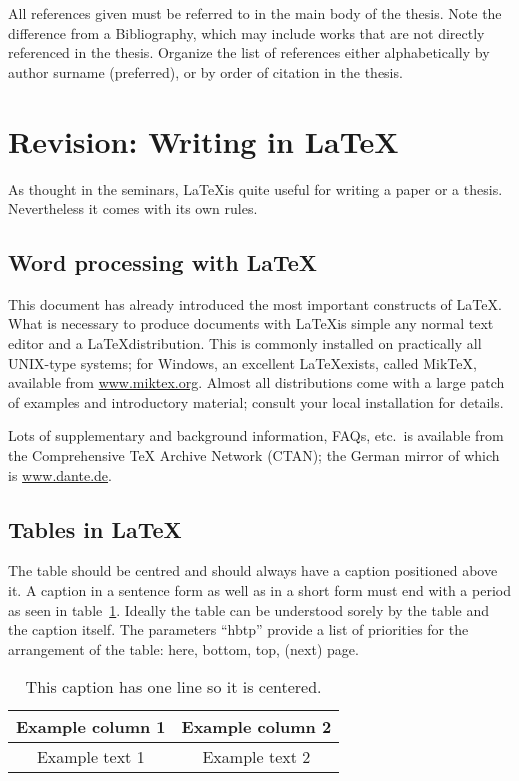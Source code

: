 All references given must be referred to in the main body of the thesis. Note the difference from a Bibliography, which may include works that are not directly referenced in the thesis. Organize the list of references either alphabetically by author surname (preferred), or by order of citation in the thesis. 



\section{Revision: Writing in \LaTeX}
As thought in the seminars, \LaTeX is quite useful for writing a paper or a thesis. Nevertheless it comes with its own rules.

\subsection{Word processing with \LaTeX}
\label{sec:model:subsec:latex}

This document has already introduced the most important constructs of
\LaTeX. What is necessary to produce documents with \LaTeX is simple
any normal text editor and a \LaTeX distribution. This is commonly
installed on practically all UNIX-type systems; for Windows, an
excellent \LaTeX exists, called MikTeX, available from
\url{www.miktex.org}. Almost all distributions come with a large patch
of examples and introductory material; consult your local installation
for details. 

Lots of supplementary and background information, FAQs, etc.\ is
available from the Comprehensive TeX Archive Network (CTAN); the
German mirror of which is \url{www.dante.de}. 

\subsection{Tables in \LaTeX}
\label{sec:model:subsec:tables}
The table should be centred and should always have a caption positioned above it. A caption in a sentence form as well as in a short form must end with a period as seen in table~\ref{tab:sample}. Ideally the table can be understood sorely by the table and the caption itself. The parameters ``hbtp'' provide a list of priorities for the arrangement of the table: here, bottom, top, (next) page.

\begin{table}[hbtp]
  \caption{This caption has one line so it is centered.}\label{tab:sample} 
  \centering
  \begin{tabular}{|c|c|}
    \hline
    Example column 1 & Example column 2 \\
    \hline
    Example text 1 & Example text 2 \\
    \hline
  \end{tabular}
\end{table}

